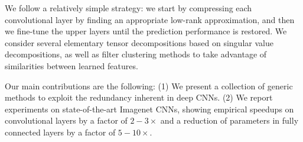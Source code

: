 We follow a relatively simple strategy: we start by compressing each 
convolutional layer by finding an appropriate low-rank approximation, 
and then we fine-tune the upper layers until the prediction performance 
is restored. We consider several elementary tensor decompositions based 
on singular value decompositions, as well as filter clustering methods to take advantage of similarities between learned features. 

Our main contributions are the following:
(1) We present a collection of generic methods to exploit the redundancy inherent in deep CNNs.
(2) We report experiments on state-of-the-art Imagenet CNNs, showing empirical speedups on 
convolutional layers by a factor of $2-3\times$ and a reduction of parameters in fully connected layers by a factor of $5-10\times$.





